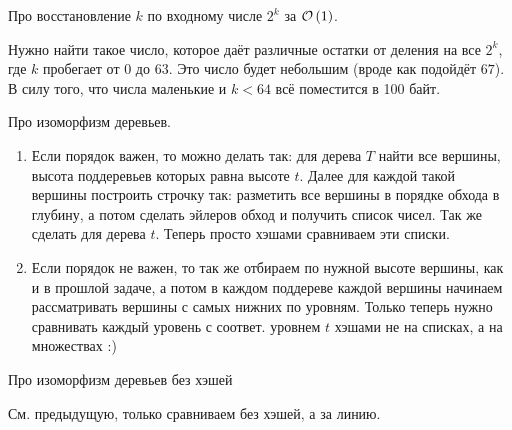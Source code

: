 \begin{task}[7]
Про восстановление $k$ по входному числе $2^k$ за $\mathcal{O}\left(1\right)$.
\end{task}
\begin{solution}
Нужно найти такое число, которое даёт различные остатки от деления на все $2^k$, где $k$ пробегает от $0$ до $63$. Это число будет небольшим (вроде как подойдёт $67$). В силу того, что числа маленькие и $k < 64$ всё поместится в 100 байт. \xqed
\end{solution}

\begin{task}[8]
Про изоморфизм деревьев.
\end{task}
\begin{solution}
\begin{enumerate}[label=(\alph*)]
\item Если порядок важен, то можно делать так: для дерева $T$ найти все вершины, высота поддеревьев которых равна высоте $t$. Далее для каждой такой вершины построить строчку так: разметить все вершины в порядке обхода в глубину, а потом сделать эйлеров обход и получить список чисел. Так же сделать для дерева $t$. Теперь просто хэшами сравниваем эти списки.
\item Если порядок не важен, то так же отбираем по нужной высоте вершины, как и в прошлой задаче, а потом в каждом поддереве каждой вершины начинаем рассматривать вершины с самых нижних по уровням. Только теперь нужно сравнивать каждый уровень с соответ. уровнем $t$ хэшами не на списках, а на множествах :)
\end{enumerate}
\end{solution}

\begin{task}[9]
Про изоморфизм деревьев без хэшей
\end{task}
\begin{solution}
См. предыдущую, только сравниваем без хэшей, а за линию.
\end{solution}


